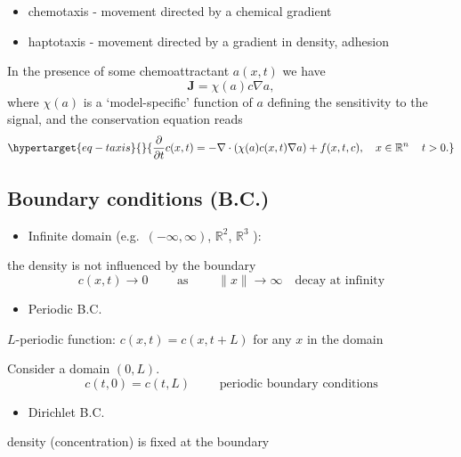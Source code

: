 \documentclass[
  letterpaper,
  DIV=11,
  numbers=noendperiod]{scrreprt}
\providecommand{\tightlist}{%
  \setlength{\itemsep}{0pt}\setlength{\parskip}{0pt}}\usepackage{longtable,booktabs,array}
\theoremstyle{plain}
\theoremstyle{definition}
\theoremstyle{plain}
\theoremstyle{remark}
\begin{document}
\begin{itemize}
  \begin{itemize}
  \tightlist
  \item
    chemotaxis - movement directed by a chemical gradient
  \item
    haptotaxis - movement directed by a gradient in density, adhesion
  \end{itemize}

  In the presence of some chemoattractant \(a(x,t)\) we have \[
    {\mathbf{J}} = \chi(a) c \nabla a,  
    \] where \(\chi(a)\) is a `model-specific' function of \(a\)
  defining the sensitivity to the signal, and the conservation equation
  reads \begin{equation}\protect\hypertarget{eq-taxis}{}{
    \frac{\partial}{\partial t} c(x,t) = -\nabla \cdot (\chi(a) c(x,t) \nabla a )  + f(x,t ,c),
    \quad x\in \mathbb R^n \,  \quad t >0. 
    }\label{eq-taxis}\end{equation}
\end{itemize}

\hypertarget{boundary-conditions-b.c.}{%
\subsection{Boundary conditions (B.C.)}\label{boundary-conditions-b.c.}}

\begin{itemize}
\tightlist
\item
  Infinite domain (e.g.~\((-\infty, \infty)\), \(\mathbb R^2\),
  \(\mathbb R^3\) ):
\end{itemize}

the density is not influenced by the boundary \[
c(x,t) \to 0 \qquad \text{ as } \qquad \|x\| \to \infty \quad  \text{decay at infinity}
\]

\begin{itemize}
\tightlist
\item
  Periodic B.C.
\end{itemize}

\(L\)-periodic function: \(c(x,t) = c(x,t +L)\) for any \(x\) in the
domain

Consider a domain \((0,L)\). \[
c(t,0) = c(t,L) \qquad  \text{ periodic boundary conditions}
\]

\begin{itemize}
\tightlist
\item
  Dirichlet B.C.
\end{itemize}

density (concentration) is fixed at the boundary
\end{document}
